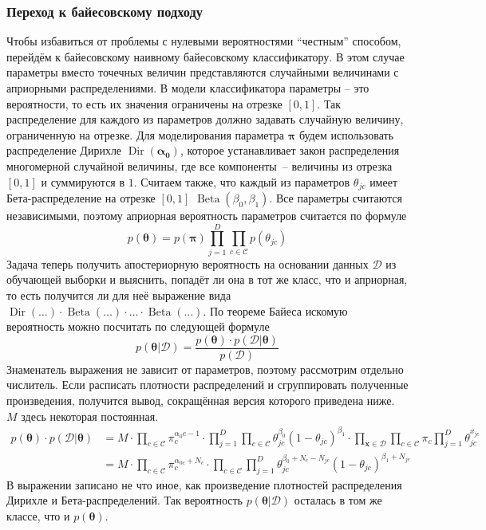 \subsubsection{Переход к байесовскому подходу}\label{bnb}
Чтобы избавиться от проблемы с нулевыми вероятностями ``честным'' способом, перейдём к байесовскому
наивному байесовскому классификатору. В этом случае параметры вместо точечных величин представляются
случайными величинами с априорными распределениями. В модели классификатора параметры -- это
вероятности, то есть их значения ограничены на отрезке $[0,1]$. Так распределение для каждого из
параметров должно задавать случайную величину, ограниченную на отрезке. Для моделирования параметра
$\mathbf{\pi}$ будем использовать распределение Дирихле $\operatorname{Dir}(\mathbf{\alpha_0})$, которое
устанавливает закон распределения многомерной случайной величины, где все компоненты~-- величины из
отрезка $[0,1]$ и суммируются в $1$. Считаем также, что каждый из параметров $\theta_{jc}$ имеет
Бета-распределение на отрезке $[0,1]$ $\operatorname{Beta}(\beta_0,\beta_1)$. Все параметры
считаются независимыми, поэтому априорная вероятность параметров считается по формуле
\begin{equation}
  p(\mathbf{\theta}) = p(\mathbf{\pi})\prod_{j=1}^D\prod_{c\in\mathcal{C}}p(\theta_{jc})
  \label{eq:apr}
\end{equation}
Задача теперь получить апостериорную вероятность на основании данных $\mathcal{D}$ из обучающей
выборки и выяснить, попадёт ли она в тот же класс, что и априорная, то есть получится ли для неё
выражение вида
$\operatorname{Dir}(\ldots)\cdot\operatorname{Beta}(\ldots)\cdot\ldots\cdot\operatorname{Beta}(\ldots)$.
По теореме Байеса искомую вероятность можно посчитать по следующей формуле
\begin{equation}
  p(\mathbf{\theta}|\mathcal{D}) =
  \frac{p(\mathbf{\theta})\cdot p(\mathcal{D}|\mathbf{\theta})}{p(\mathcal{D})}
  \label{eq:apo}
\end{equation}
Знаменатель выражения не зависит от параметров, поэтому рассмотрим отдельно числитель. Если
расписать плотности распределений и сгруппировать полученные произведения, получится вывод,
сокращённая версия которого приведена ниже. $M$ здесь некоторая постоянная.
\begin{align}
  p(\mathbf{\theta}) \cdot p(\mathcal{D}|\mathbf{\theta})
  & =  M\cdot\prod_{c\in\mathcal{C}}\pi_c^{\alpha_0c-1}\cdot
  \prod_{j=1}^D\prod_{c\in\mathcal{C}}\theta_{jc}^{\beta_0}(1-\theta_{jc})^{\beta_1}\cdot
  \prod_{\mathbf{x}\in\mathcal{D}}\prod_{c\in\mathcal{C}}\pi_c\prod_{j=1}^D\theta_{jc}^{x_{jc}} \label{eq:plo1}\\
  & = M\cdot\prod_{c\in\mathcal{C}}\pi_c^{\alpha_{0c}+N_c}\cdot
  \prod_{c\in\mathcal{C}}\prod_{j=1}^D\theta_{jc}^{\beta_0+N_c-N_{jc}}(1-\theta_{jc})^{\beta_1+N_{jc}}
  \label{eq:plo2}
\end{align}
В выражении \label{eq:plo2} записано не что иное, как произведение плотностей распределения Дирихле и
Бета-распределений. Так вероятность $p(\mathbf{\theta}|\mathcal{D})$ осталась в том же классе, что и
$p(\mathbf{\theta})$.

